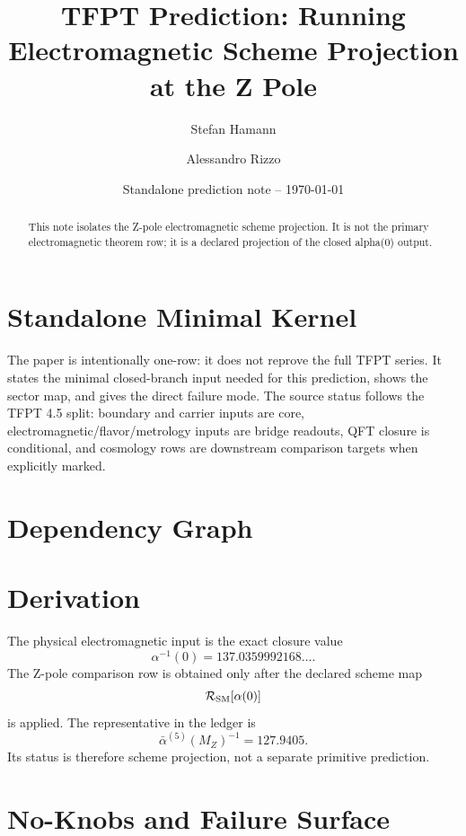 \documentclass[11pt,a4paper]{article}
\title{\color{tfptblue}\textbf{TFPT Prediction: Running Electromagnetic Scheme Projection at the Z Pole}}
\author{Stefan Hamann \and Alessandro Rizzo}
\date{{\normalsize\color{tfptgray}\sffamily Standalone prediction note -- \today}}
\begin{document}
\maketitle

\begin{abstract}
This note isolates the Z-pole electromagnetic scheme projection. It is not the primary electromagnetic theorem row; it is a declared projection of the closed alpha(0) output.
\end{abstract}



\section{Standalone Minimal Kernel}
\MinimalKernelBox

The paper is intentionally one-row: it does not reprove the full TFPT series. It states the minimal closed-branch input needed for this prediction, shows the sector map, and gives the direct failure mode. The source status follows the TFPT 4.5 split: boundary and carrier inputs are core, electromagnetic/flavor/metrology inputs are bridge readouts, QFT closure is conditional, and cosmology rows are downstream comparison targets when explicitly marked.


\section{Dependency Graph}

\section{Derivation}

The physical electromagnetic input is the exact closure value
\[
\alpha^{-1}(0)=137.0359992168\ldots.
\]
The Z-pole comparison row is obtained only after the declared scheme map
\[
\mathcal R_{\mathrm{SM}}[\alpha(0)]
\]
is applied. The representative in the ledger is
\[
\bar\alpha^{(5)}(M_Z)^{-1}=127.9405.
\]
Its status is therefore scheme projection, not a separate primitive prediction.


\section{No-Knobs and Failure Surface}
\end{document}

